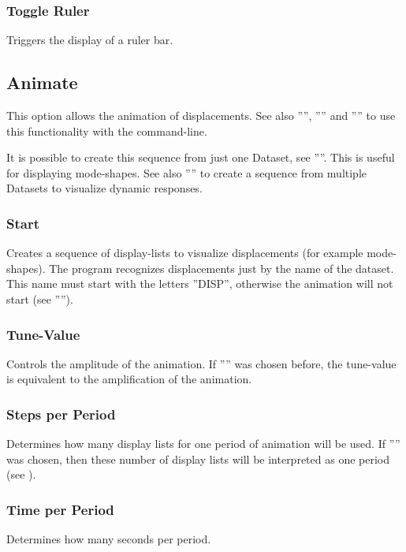 \documentclass{article}
\begin{document}
\subsubsection{\label{Toggle Ruler}Toggle Ruler}
Triggers the display of a ruler bar.

\subsection{\label{animation}Animate}
This option allows the animation of displacements. See also '''', '''' and '''' to use this functionality with the command-line.

It is possible to create this sequence from just one Dataset, see ''''. This is useful for displaying mode-shapes. See also '''' to create a sequence from multiple Datasets to visualize dynamic responses.
   
\subsubsection{\label{Start}Start}
Creates a sequence of display-lists to visualize displacements (for example mode-shapes). The program recognizes displacements just by the name of the dataset. This name must start with the letters ''DISP'', otherwise the animation will not start (see '''').

\subsubsection{\label{Tune-Value}Tune-Value}
Controls the amplitude of the animation. If '''' was chosen before, the tune-value is equivalent to the amplification of the animation. 

\subsubsection{\label{Steps per Period}Steps per Period}
Determines how many display lists for one period of animation will be used. If '''' was chosen, then these number of display lists will be interpreted as one period (see ).

\subsubsection{\label{Time per Period}Time per Period}
Determines how many seconds per period. 
\end{document}
